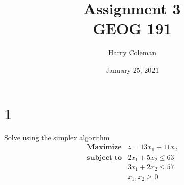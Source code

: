 \documentclass[12pt]{article}
\title{Assignment 3\\
    \large GEOG 191
}
\author{Harry Coleman}
\date{January 25, 2021}
\newenvironment{problem}
    {\begin{lrbox}{\mybox}\begin{minipage}{0.98\textwidth}}
    {\end{minipage}\end{lrbox}\begin{center}\framebox[\textwidth]{\usebox{\mybox}}\end{center}}
\theoremstyle{definition}
\begin{document}
\maketitle

\section*{1}
\begin{problem}
    Solve using the simplex algorithm
    \[
        \begin{array}{ll}
            \textbf{Maximize} & z = 13x_1 + 11x_2 \\
            \textbf{subject to} & 2x_1 + 5x_2 \leq 63 \\
                & 3x_1 + 2x_2 \leq 57 \\
                & x_1, x_2 \geq 0
        \end{array}
    \]
\end{problem}
\end{document}
